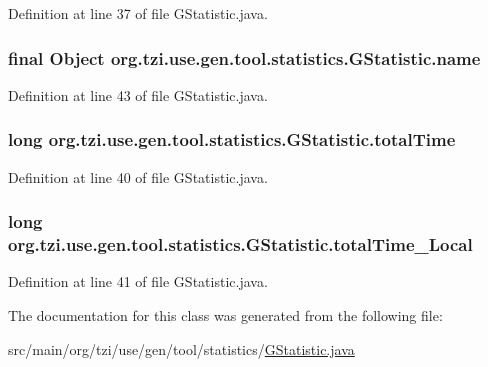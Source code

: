 Definition at line 37 of file G\-Statistic.\-java.

\hypertarget{classorg_1_1tzi_1_1use_1_1gen_1_1tool_1_1statistics_1_1_g_statistic_a39c74856cd7b4e4dae3366c182ff808e}{
\subsubsection[{name}]{\setlength{\rightskip}{0pt plus 5cm}final Object org.\-tzi.\-use.\-gen.\-tool.\-statistics.\-G\-Statistic.\-name\hspace{0.3cm}{\ttfamily [protected]}}}\label{classorg_1_1tzi_1_1use_1_1gen_1_1tool_1_1statistics_1_1_g_statistic_a39c74856cd7b4e4dae3366c182ff808e}


Definition at line 43 of file G\-Statistic.\-java.

\hypertarget{classorg_1_1tzi_1_1use_1_1gen_1_1tool_1_1statistics_1_1_g_statistic_ad02687a084712fbf4a075b2c37a73b6e}{
\subsubsection[{total\-Time}]{\setlength{\rightskip}{0pt plus 5cm}long org.\-tzi.\-use.\-gen.\-tool.\-statistics.\-G\-Statistic.\-total\-Time\hspace{0.3cm}{\ttfamily [protected]}}}\label{classorg_1_1tzi_1_1use_1_1gen_1_1tool_1_1statistics_1_1_g_statistic_ad02687a084712fbf4a075b2c37a73b6e}


Definition at line 40 of file G\-Statistic.\-java.

\hypertarget{classorg_1_1tzi_1_1use_1_1gen_1_1tool_1_1statistics_1_1_g_statistic_a46bbc8e2d98746061f547b11e059dcf9}{
\subsubsection[{total\-Time\-\_\-\-Local}]{\setlength{\rightskip}{0pt plus 5cm}long org.\-tzi.\-use.\-gen.\-tool.\-statistics.\-G\-Statistic.\-total\-Time\-\_\-\-Local\hspace{0.3cm}{\ttfamily [protected]}}}\label{classorg_1_1tzi_1_1use_1_1gen_1_1tool_1_1statistics_1_1_g_statistic_a46bbc8e2d98746061f547b11e059dcf9}


Definition at line 41 of file G\-Statistic.\-java.



The documentation for this class was generated from the following file\-:\begin{DoxyCompactItemize}
\item 
src/main/org/tzi/use/gen/tool/statistics/\hyperlink{_g_statistic_8java}{G\-Statistic.\-java}\end{DoxyCompactItemize}
